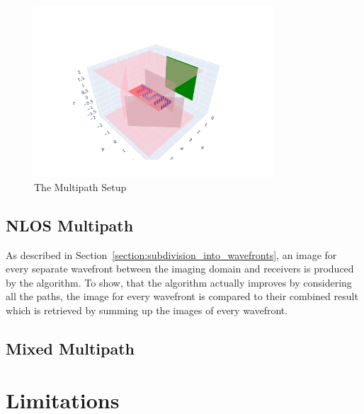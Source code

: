 \begin{figure}[ht]
    \centering
    \includegraphics[width=0.8\textwidth]{figures/MultipathNLOS_setup.pdf}
    \caption{The Multipath Setup}\label{fig:MultipathNLOS_setup}
\end{figure}

\subsection{NLOS Multipath}
As described in Section~\ref{section:subdivision_into_wavefronts}, an image for every separate wavefront between the imaging domain and receivers is produced by the algorithm.
To show, that the algorithm actually improves by considering all the paths, the image for every wavefront is compared to their combined result which is retrieved by summing up the images of every wavefront.



\subsection{Mixed Multipath}

\section{Limitations}